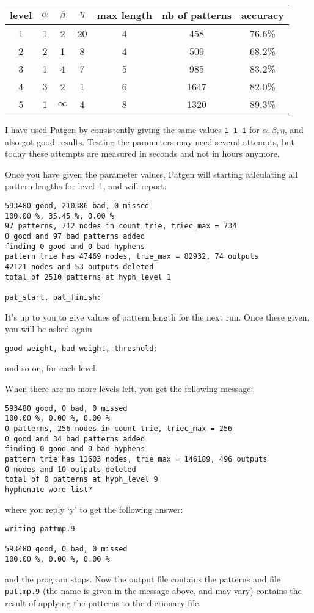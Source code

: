 \documentclass{article}
\begin{document}
\begin{center}
\begin{tabular}{ccccccc}
level&$\alpha$&$\beta$&$\eta$&max length&nb of patterns&accuracy\\\hline
1&1&2&20&4&458&76.6\%\\
2&2&1&8&4&509&68.2\%\\
3&1&4&7&5&985&83.2\%\\
4&3&2&1&6&1647&82.0\%\\
5&1&$\infty$&4&8&1320&89.3\%
\end{tabular}
\end{center}

I have used Patgen by consistently giving the same values \texttt{1 1 1} for $\alpha,\beta,\eta$, and also got good results. Testing the parameters may need several attempts, but today these attempts are measured in seconds and not in hours anymore.

Once you have given the parameter values, Patgen will starting calculating all pattern lengths for level~1, and will report:
\begin{verbatim}
593480 good, 210386 bad, 0 missed
100.00 %, 35.45 %, 0.00 %
97 patterns, 712 nodes in count trie, triec_max = 734
0 good and 97 bad patterns added 
finding 0 good and 0 bad hyphens 
pattern trie has 47469 nodes, trie_max = 82932, 74 outputs
42121 nodes and 53 outputs deleted
total of 2510 patterns at hyph_level 1

pat_start, pat_finish:
\end{verbatim}
It's up to you to give values of pattern length for the next run. Once these given, you will be asked again
\begin{verbatim}
good weight, bad weight, threshold: 
\end{verbatim}
and so on, for each level.

When there are no more levels left, you get the following message:
\begin{verbatim}
593480 good, 0 bad, 0 missed
100.00 %, 0.00 %, 0.00 %
0 patterns, 256 nodes in count trie, triec_max = 256
0 good and 34 bad patterns added 
finding 0 good and 0 bad hyphens 
pattern trie has 11603 nodes, trie_max = 146189, 496 outputs
0 nodes and 10 outputs deleted
total of 0 patterns at hyph_level 9
hyphenate word list? 
\end{verbatim}
where you reply `y' to get the following answer:
\begin{verbatim}
writing pattmp.9
 
593480 good, 0 bad, 0 missed
100.00 %, 0.00 %, 0.00 %
\end{verbatim}
and the program stops. Now the output file contains the patterns and file \verb=pattmp.9= (the name is given in the message above, and may vary) contains the result of applying the patterns to the dictionary file.
\end{document}
